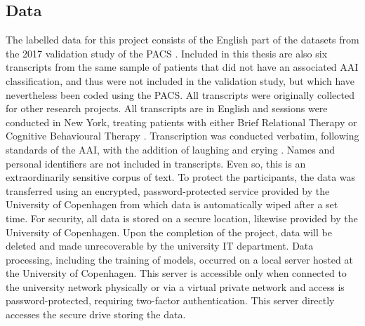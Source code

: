 \documentclass[12pt]{report}
\begin{document}
\subsection{Data}
The labelled data for this project consists of the English part of the datasets from the 2017 validation study of the PACS \cite{Talia2017}.
Included in this thesis are also six transcripts from the same sample of patients that did not have an associated AAI classification, and thus were not included in the validation study, but which have nevertheless been coded using the PACS.
All transcripts were originally collected for other research projects.
All transcripts are in English and sessions were conducted in New York, treating patients with either Brief Relational Therapy \cite{Safran2000} or Cognitive Behavioural Therapy \cite{Beck2011}.
Transcription was conducted verbatim, following standards of the AAI, with the addition of laughing and crying \cite{Talia2017, Talia2014}.
Names and personal identifiers are not included in transcripts.
Even so, this is an extraordinarily sensitive corpus of text.
To protect the participants, the data was transferred using an encrypted, password-protected service provided by the University of Copenhagen from which data is automatically wiped after a set time.
For security, all data is stored on a secure location, likewise provided by the University of Copenhagen.
Upon the completion of the project, data will be deleted and made unrecoverable by the university IT department.
Data processing, including the training of models, occurred on a local server hosted at the University of Copenhagen.
This server is accessible only when connected to the university network physically or via a virtual private network and access is password-protected, requiring two-factor authentication.
This server directly accesses the secure drive storing the data.
\end{document}
